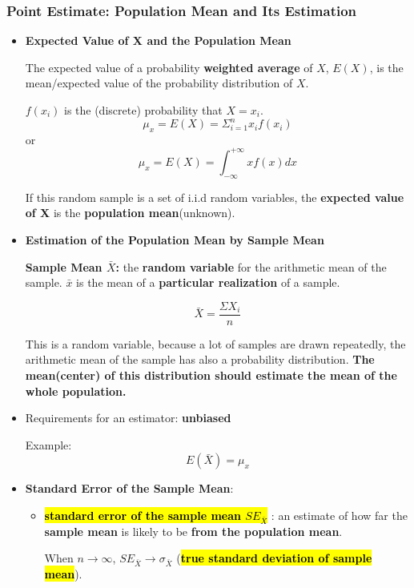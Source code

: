 \subsubsection{Point Estimate: Population Mean and Its Estimation}
\begin{itemize}
	\item \textbf{Expected Value of X and the Population Mean}
	
	The expected value of a probability \textbf{weighted average} of $X$, $E(X)$, is the mean/expected value of the probability distribution of $X$. 
	
	$f(x_i)$ is the (discrete) probability that $X = x_i$.
	$$\mu_x = E(X) = \Sigma_{i=1}^{n} x_i f(x_i)$$ or $$\mu_x = E(X) = \int_{-\infty}^{+\infty} xf(x) dx$$ 
	
	If this random sample is a set of i.i.d random variables, the \textbf{expected value of X} is the \textbf{population mean}(unknown).
	
	\item \textbf{Estimation of the Population Mean by Sample Mean}
	
	\textbf{Sample Mean $\bar{X}$:} the \textbf{random variable} for the arithmetic mean of the sample. $\bar{x}$ is the mean of a \textbf{particular realization} of a sample.
	
	 
	$$\bar{X} = \frac{\Sigma X_i}{n} $$
	
	This is a random variable, because a lot of samples are drawn repeatedly, the arithmetic mean of the sample has also a probability distribution. \textbf{The mean(center) of this distribution should estimate the mean of the whole population. }
	
	
	
	\item Requirements for an estimator: \textbf{unbiased}
	
	Example: $$E(\bar{X}) = \mu_x$$
	
	\item \textbf{Standard Error of the Sample Mean}: 
	
	\begin{itemize}
		\item  \hl{\textbf{standard error of the sample mean $SE_{\bar{X}}$}} : an estimate of how far the \textbf{sample mean} is likely to be \textbf{from the population mean}. 
		
		When $n \rightarrow \infty$,  $SE_{\bar{X}}  \rightarrow \sigma_{\bar{X}}$ (\hl{\textbf{true standard deviation of sample mean}}).
		

\end{itemize}
\end{itemize}

